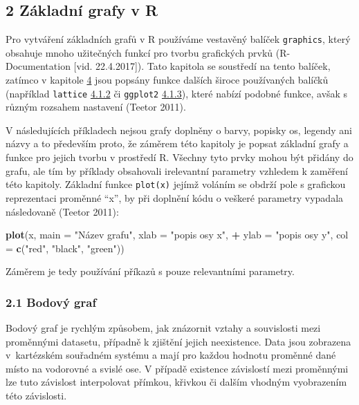 \documentclass[12pt,]{article}
\newenvironment{Shaded}{\begin{snugshade}}{\end{snugshade}}
\newcommand{\KeywordTok}[1]{\textcolor[rgb]{0.13,0.29,0.53}{\textbf{#1}}}
\newcommand{\DataTypeTok}[1]{\textcolor[rgb]{0.13,0.29,0.53}{#1}}
\newcommand{\StringTok}[1]{\textcolor[rgb]{0.31,0.60,0.02}{#1}}
\newcommand{\OperatorTok}[1]{\textcolor[rgb]{0.81,0.36,0.00}{\textbf{#1}}}
\newcommand{\NormalTok}[1]{#1}
\begin{document}
\hypertarget{base}{\subsection{2 Základní grafy v R}\label{base}}

\qquad Pro vytváření základních grafů v R používáme vestavěný balíček
\texttt{graphics}, který obsahuje mnoho užitečných funkcí pro tvorbu
grafických prvků (R-Documentation {[}vid. 22.4.2017{]}). Tato kapitola
se soustředí na tento balíček, zatímco v kapitole
\protect\hyperlink{pokrocila}{4} jsou popsány funkce dalších široce
používaných balíčků (například \texttt{lattice}
\protect\hyperlink{lattice}{4.1.2} či \texttt{ggplot2}
\protect\hyperlink{ggplot}{4.1.3}), které nabízí podobné funkce, avšak s
různým rozsahem nastavení (Teetor 2011).

\qquad V následujících příkladech nejsou grafy doplněny o barvy, popisky
os, legendy ani názvy a to především proto, že záměrem této kapitoly je
popsat základní grafy a funkce pro jejich tvorbu v prostředí R. Všechny
tyto prvky mohou být přidány do grafu, ale tím by příklady obsahovali
irelevantní parametry vzhledem k zaměření této kapitoly. Základní funkce
\texttt{plot(x)} jejímž voláním se obdrží pole s grafickou reprezentaci
proměnné \enquote{x}, by při doplnění kódu o veškeré parametry vypadala
následovaně (Teetor 2011):

\begin{Shaded}
\begin{Highlighting}[]
\KeywordTok{plot}\NormalTok{(x, }\DataTypeTok{main =} \StringTok{"Název grafu"}\NormalTok{, }\DataTypeTok{xlab =} \StringTok{"popis osy x"}\NormalTok{, }
\OperatorTok{+}\StringTok{    }\DataTypeTok{ylab =} \StringTok{"popis osy y"}\NormalTok{, }\DataTypeTok{col =} \KeywordTok{c}\NormalTok{(}\StringTok{"red"}\NormalTok{, }\StringTok{"black"}\NormalTok{, }\StringTok{"green"}\NormalTok{)) }
\end{Highlighting}
\end{Shaded}

Záměrem je tedy používání příkazů s pouze relevantními parametry.

\hypertarget{scatterplot}{\subsubsection{2.1 Bodový
graf}\label{scatterplot}}

\qquad Bodový graf je rychlým způsobem, jak znázornit vztahy a
souvislosti mezi proměnnými datasetu, případně k zjištění jejich
neexistence. Data jsou zobrazena v~kartézském souřadném systému a mají
pro každou hodnotu proměnné dané místo na vodorovné a svislé ose. V
případě existence závislostí mezi proměnnými lze tuto závislost
interpolovat přímkou, křivkou či dalším vhodným vyobrazením této
závislosti.
\end{document}
